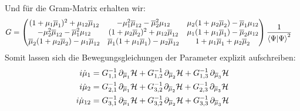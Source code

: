 \noindent Und für die Gram-Matrix erhalten wir:
\begin{align}\label{Gram_Korrektur}
    G &=
    \begin{pmatrix}
        (1+\mu_1\overline{\mu}_1)^2 + \mu_{12}\overline{\mu}_{12} & -\mu_1^2\overline{\mu}_{12} - \overline{\mu}_2^2\mu_{12} &  \mu_2(1+\mu_2\overline{\mu}_2)-\overline{\mu}_1\mu_{12}\\
        -\mu_2^2\overline{\mu}_{12} - \overline{\mu}_1^2\mu_{12} &(1+\mu_2\overline{\mu}_2)^2 + \mu_{12}\overline{\mu}_{12} & \mu_1(1+\mu_1\overline{\mu}_1)-\overline{\mu}_2\mu_{12}\\
        \overline{\mu}_2(1+\mu_2\overline{\mu}_2)-\mu_1\overline{\mu}_{12} & \overline{\mu}_1(1+\mu_1\overline{\mu}_1)-\mu_2\overline{\mu}_{12} & 1 + \mu_1\overline{\mu}_1 + \mu_2\overline{\mu}_2
    \end{pmatrix}\frac{1}{\bra{\Psi}\ket{\Psi}^2} 
\end{align}
Somit lassen sich die Bewegungsgleichungen der Parameter explizit aufschreiben:
\begin{align}
    i\dot{\mu}_1 &= G_{1,1}^{-1}\thinspace \partial_{\overline{\mu}_1}\mathcal{H} + G_{1,2}^{-1}\thinspace\partial_{\overline{\mu}_2}\mathcal{H} + G_{1,3}^{-1}\thinspace\partial_{\overline{\mu}_3}\mathcal{H}\label{QK_DGL1} \\
    i\dot{\mu}_2 &= G_{2,1}^{-1}\thinspace\partial_{\overline{\mu}_1}\mathcal{H} + G_{3,2}^{-1\thinspace}\partial_{\overline{\mu}_2}\mathcal{H} + G_{2,3}^{-1}\thinspace\partial_{\overline{\mu}_3}\mathcal{H} \\
    i\dot{\mu}_{12} &= G_{3,1}^{-1}\thinspace\partial_{\overline{\mu}_1}\mathcal{H} + G_{3,2}^{-1}\thinspace\partial_{\overline{\mu}_2}\mathcal{H} + G_{3,3}^{-1}\thinspace\partial_{\overline{\mu}_3}\mathcal{H} \label{QK_DGL3}
\end{align}


